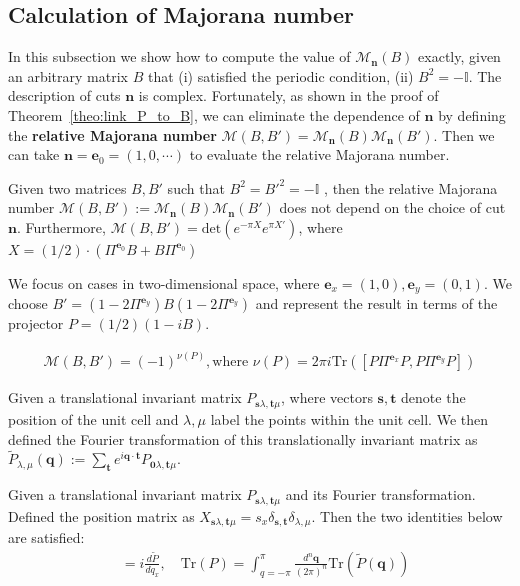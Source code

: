 \subsection{Calculation of Majorana number}
In this subsection we show how to compute the value of $\mathcal{M}_{\mathbf n}(B)$ exactly, given an arbitrary matrix $B$ that (i)  satisfied the periodic condition, (ii) $B^2 = -\mathbb{I}$.  
The description of cuts $\mathbf{n}$ is complex.
Fortunately, as shown in the proof of Theorem~\ref{theo:link_P_to_B},
we can eliminate the dependence of $\mathbf{n}$ by defining the \textbf{relative Majorana number} $\mathcal{M}(B,B') =\mathcal{M}_{\mathbf{n}}(B) \mathcal{M}_{\mathbf{n}}(B') $.
Then we can take $\mathbf{n} =\mathbf{e}_0= (1,0,\cdots)$ to evaluate the relative Majorana number.
\begin{lemma}
    Given two matrices $B,B'$ such that $B^2 =B'^2= -\mathbb{I}$ , then the relative Majorana number $\mathcal{M}(B,B') :=\mathcal{M}_{\mathbf{n}}(B) \mathcal{M}_{\mathbf{n}}(B') $ does not depend on the choice of cut $\mathbf{n}$. Furthermore,  $\mathcal{M}(B,B') = \text{det}(e^{-\pi X}e^{\pi X'})$, where $X = (1/2)\cdot (\Pi^{\mathbf{e}_0} B + B \Pi^{\mathbf{e}_0})$
\end{lemma}
We focus on cases in two-dimensional space, where $\mathbf{e}_x = (1,0),\mathbf e_y = (0,1)$. 
We choose $B' = (1 - 2\Pi^{\mathbf{e}_y})B(1 - 2\Pi^{\mathbf{e}_y})$ and represent the result in terms of the projector $P = (1/2)(1 - iB)$. 
\begin{theorem}\label{theorem:chern}
    \begin{align}
        \mathcal{M}(B,B')= (-1)^{\nu(P)}, \text{where~} \nu(P) = 2\pi i \text{Tr}\left([P \Pi^{\mathbf e_x} P,P \Pi^{\mathbf e_y} P]\right)
    \end{align}
\end{theorem}
Given a translational invariant matrix $P_{\mathbf s\lambda,\mathbf t\mu}$,
where vectors $\mathbf s,\mathbf t$ denote the position of the unit cell and $\lambda,\mu$ label the points within the unit cell.
We then defined the Fourier transformation of this translationally invariant matrix as $\tilde P_{\lambda,\mu}(\mathbf{q}):= \sum_{\mathbf t} e^{i \mathbf q \cdot \mathbf t}P_{\mathbf0\lambda, \mathbf t\mu}$.
\begin{lemma}
\label{lemma:trace_to_int}
    Given a translational invariant matrix $P_{\mathbf s\lambda,\mathbf t\mu}$ and its Fourier transformation. Defined the position matrix as $X_{\mathbf s\lambda,\mathbf t\mu} = s_x \delta_{\mathbf{s},\mathbf{t}} \delta_{\lambda, \mu}$. Then the two identities below are satisfied:
    \begin{align}
        [X,P] &= i \frac{d\tilde{P}}{dq_x},  \quad \text{Tr}(P) = \int_{q = -\pi}^{\pi}\frac{d^n\mathbf q}{(2\pi)^n} \text{Tr}(\tilde P(\mathbf q))\\
    \end{align}
\end{lemma}
